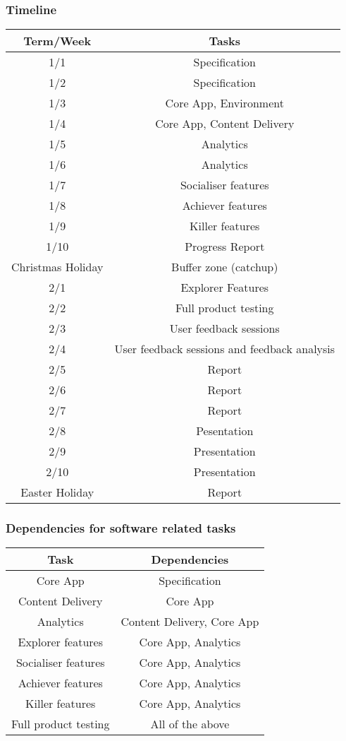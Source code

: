 \subsubsection*{Timeline}
\begin{tabular}{|c|c|}
\hline Term/Week & Tasks \\ 
\hline 1/1 & Specification \\ 
\hline 1/2 & Specification \\ 
\hline 1/3 & Core App, Environment \\ 
\hline 1/4 & Core App, Content Delivery \\ 
\hline 1/5 & Analytics \\ 
\hline 1/6 & Analytics \\ 
\hline 1/7 & Socialiser features \\ 
\hline 1/8 & Achiever features \\ 
\hline 1/9 & Killer features \\ 
\hline 1/10 & Progress Report \\ 
\hline Christmas Holiday & Buffer zone (catchup) \\
\hline 2/1 & Explorer Features \\ 
\hline 2/2 & Full product testing \\ 
\hline 2/3 & User feedback sessions \\ 
\hline 2/4 & User feedback sessions and feedback analysis \\ 
\hline 2/5 & Report \\ 
\hline 2/6 & Report \\ 
\hline 2/7 & Report \\ 
\hline 2/8 & Pesentation \\ 
\hline 2/9 & Presentation \\ 
\hline 2/10 & Presentation \\
\hline Easter Holiday & Report \\
\hline 
\end{tabular}
\subsubsection*{Dependencies for software related tasks}
\begin{tabular}{|c|c|}
\hline Task & Dependencies \\ 
\hline Core App & Specification \\ 
\hline Content Delivery & Core App \\ 
\hline Analytics & Content Delivery, Core App \\ 
\hline Explorer features & Core App, Analytics \\ 
\hline Socialiser features & Core App, Analytics \\ 
\hline Achiever features & Core App, Analytics \\ 
\hline Killer features & Core App, Analytics \\
\hline Full product testing & All of the above \\
\hline 
\end{tabular} 
